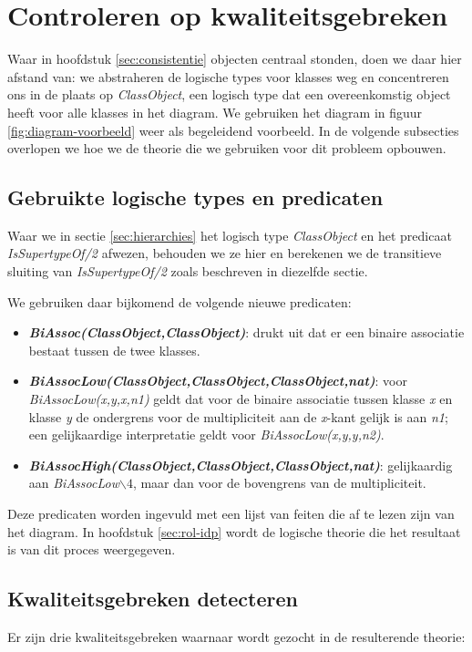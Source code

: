 \chapter{Controleren op kwaliteitsgebreken}\label{sec:kwaliteitsgebrek}
Waar in hoofdstuk \ref{sec:consistentie} objecten centraal stonden, doen we daar hier afstand van: we abstraheren de logische types voor klasses weg en concentreren ons in de plaats op \textit{ClassObject}, een logisch type dat een overeenkomstig object heeft voor alle klasses in het diagram. We gebruiken het diagram in figuur \ref{fig:diagram-voorbeeld} weer als begeleidend voorbeeld. In de volgende subsecties overlopen we hoe we de theorie die we gebruiken voor dit probleem opbouwen.

\section{Gebruikte logische types en predicaten}
Waar we in sectie \ref{sec:hierarchies} het logisch type \textit{ClassObject} en het predicaat \textit{IsSupertypeOf/2} afwezen, behouden we ze hier en berekenen we de transitieve sluiting van \textit{IsSupertypeOf/2} zoals beschreven in diezelfde sectie.

We gebruiken daar bijkomend de volgende nieuwe predicaten:

\begin{itemize}
	\item \textbf{\textit{BiAssoc(ClassObject,ClassObject)}}: drukt uit dat er een binaire associatie bestaat tussen de twee klasses.
	\item \textbf{\textit{BiAssocLow(ClassObject,ClassObject,ClassObject,nat)}}: voor \textit{BiAssocLow(x,y,x,n1)} geldt dat voor de binaire associatie tussen klasse \textit{x} en klasse \textit{y} de ondergrens voor de multipliciteit aan de \textit{x}-kant gelijk is aan \textit{n1}; een gelijkaardige interpretatie geldt voor \textit{BiAssocLow(x,y,y,n2)}.
	\item \textbf{\textit{BiAssocHigh(ClassObject,ClassObject,ClassObject,nat)}}: gelijkaardig aan \textit{BiAssocLow$\backslash4$}, maar dan voor de bovengrens van de multipliciteit.
\end{itemize}

Deze predicaten worden ingevuld met een lijst van feiten die af te lezen zijn van het diagram. In hoofdstuk \ref{sec:rol-idp} wordt de logische theorie die het resultaat is van dit proces weergegeven.

\section{Kwaliteitsgebreken detecteren}
Er zijn drie kwaliteitsgebreken waarnaar wordt gezocht in de resulterende theorie:

